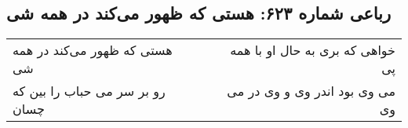 \begin{center}
\section*{رباعی شماره ۶۲۳: هستی که ظهور می‌کند در همه شی}
\label{sec:sh623}
\begin{longtable}{l p{0.5cm} r}
هستی که ظهور می‌کند در همه شی
&&
خواهی که بری به حال او با همه پی
\\
رو بر سر می حباب را بین که چسان
&&
می وی بود اندر وی و وی در می وی
\\
\end{longtable}
\end{center}
